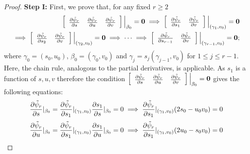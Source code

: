 \documentclass[10pt,a4paper]{amsart}
\begin{document}
\begin{proof} 
\textbf{Step I:}
First, we prove that, for any fixed $r\geq 2$
\begin{eqnarray*}
\left[\begin{array}{ccc}
    \frac{\partial\Tilde{\psi}_r}{\partial s} & \frac{\partial\Tilde{\psi}_r}{\partial u} & \frac{\partial\Tilde{\psi}_r}{\partial v}  \end{array}\right]\Big |_{\beta_0}=\mathbf{0}\implies \left[\begin{array}{ccc}\frac{\partial\Tilde{\psi}_r}{\partial s_1} & \frac{\partial\Tilde{\psi}_r}{\partial v}  \end{array}\right]\Big |_{(\gamma_1,v_0)}=\mathbf{0} \\\implies \left[\begin{array}{ccc}
    \frac{\partial\Tilde{\psi}_r}{\partial s_2} & \frac{\partial\Tilde{\psi}_r}{\partial v}  \end{array}\right]\Big |_{(\gamma_2,v_0)}=\mathbf{0}\implies\cdots\implies \left[\begin{array}{ccc}
    \frac{\partial\Tilde{\psi}_r}{\partial s_{r-1}} & \frac{\partial\Tilde{\psi}_r}{\partial v}  \end{array}\right]\Big |_{(\gamma_{r-1},v_0)}=\mathbf{0} ; 
    \end{eqnarray*}
where $\gamma_0=(s_0,u_0)$, $\beta_0=(\gamma_0,v_0)$ and $\gamma_j=s_j(\gamma_{j-1},v_0)$ for $1\leq j\leq r-1$. Here, the chain rule, analogous to the partial derivatives, is applicable. As $s_1$ is a function of $s,u,v$ therefore the condition $\left[\begin{array}{cccccccc}
  \frac{\partial\Tilde{\psi}_r}{\partial s} & \frac{\partial\Tilde{\psi}_r}{\partial u} & \frac{\partial\Tilde{\psi}_r}{\partial v}\end{array}\right]\Big|_{\beta_0}=\mathbf{0}$ gives the following equations:
\begin{equation}{\label{lemsimp i}}
\frac{\partial\Tilde{\psi}_r}{\partial s}|_{\beta_0}=\frac{\partial\Tilde{\psi}_r}{\partial s_1}|_{(\gamma_1,v_0)}\frac{\partial s_1}{\partial s}|_{\beta_0}=0\implies \frac{\partial\Tilde{\psi}_r}{\partial s_1}|_{(\gamma_1,v_0)}(2s_0-u_0v_0)=0 \end{equation}
 \begin{equation}{\label{lemsimp ii}}
   \frac{\partial\Tilde{\psi}_r}{\partial u}|_{\beta_0}=\frac{\partial\Tilde{\psi}_r}{\partial s_1}|_{(\gamma_1,v_0)}\frac{\partial s_1}{\partial u}|_{\beta_0}=0\implies \frac{\partial\Tilde{\psi}_r}{\partial s_1}|_{(\gamma_1,v_0)}(2u_0-s_0v_0)=0 

\end{equation}
\end{proof}
\end{document}
